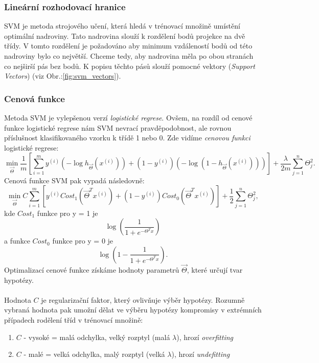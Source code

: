 \documentclass[a4]{article}
\begin{document}
\subsubsection{Lineární rozhodovací hranice}
SVM je metoda strojového učení, která hledá v trénovací množině umístění optimální nadroviny. Tato nadrovina slouží k rozdělení bodů projekce na dvě třídy. V tomto rozdělení je požadováno aby minimum vzdáleností bodů od této nadroviny bylo co největší. Chceme tedy, aby nadrovina měla po obou stranách co nejširší pás bez bodů. K popisu těchto pásů slouží pomocné vektory (\textit{Support Vectors}) (viz Obr.:\ref{fig:svm_vectors}).
\cite{svm_zcu}

\subsubsection{Cenová funkce}
Metoda SVM je vylepšenou verzí \textit{logistické regrese}. Ovšem, na rozdíl od cenové funkce logistické regrese nám SVM nevrací pravděpodobnost, ale rovnou příslušnost klasifikovaného vzorku k třídě 1 nebo 0. Zde vidíme \textit{cenovou funkci} logistické regrese:
$$
\min_{\vec{\Theta}} \frac{1}{m}[\sum_{i=1}^{m}y^{(i)}(-\log h_{\vec{\Theta}}(x^{(i)}))+(1-y^{(i)})(-\log(1-h_{\vec{\Theta}}(x^{(i)})))]+\frac{\lambda}{2m}\sum_{j=1}^{n}\Theta_{j}^{2}.
$$
\noindent Cenová funkce SVM pak vypadá následovně:
$$
\min_{\vec{\Theta}} C \sum_{i=1}^{m}[y^{(i)} Cost_1 (\vec{\Theta}^T x^{(i)})+(1-y^{(i)}) Cost_0 (\vec{\Theta}^T x^{(i)})] + \frac{1}{2} \sum_{j=1}^{n}\Theta_{j}^{2},
$$
\noindent kde $Cost_1$ funkce pro y = 1 je
$$
\log(\frac{1}{1 + e^{-\Theta^{T}x}})
$$
\noindent a funkce $Cost_0$ funkce pro y = 0 je
$$
\log(1-\frac{1}{1 + e^{-\Theta^{T}x}}).
$$
\noindent Optimalizací cenové funkce získáme hodnoty parametrů $\vec{\Theta}$, které určují tvar hypotézy.
\\\\
Hodnota $C$ je regularizační faktor, který ovlivňuje výběr hypotézy. Rozumně vybraná hodnota pak umožní dělat ve výběru hypotézy kompromisy v extrémních případech rodělení tříd v trénovací množině:

\begin{enumerate}
	\item $C$ - vysoké = malá odchylka, velký rozptyl (malá $\lambda$), hrozí \textit{overfitting}
	\item $C$ - malé = velká odchylka, malý rozptyl (velká $\lambda$), hrozí \textit{undefitting}
\end{enumerate}
\end{document}
